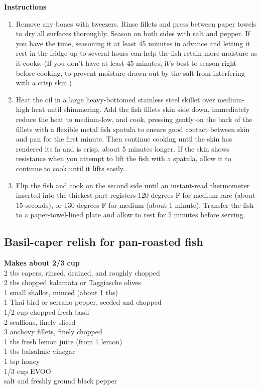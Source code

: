 \documentclass{article}
\numberwithin{figure}{section}
\numberwithin{equation}{section}
\begin{document}
{\bf Instructions}
\begin{enumerate}
\item Remove any bones with tweezers. Rinse fillets and press between paper towels to dry all surfaces thoroughly. Season on both sides with salt and pepper. If you have the time, seasoning it at least 45 minutes in advance and letting it rest in the fridge up to several hours can help the fish retain more moisture as it cooks. (If you don't have at least 45 minutes, it's best to season right before cooking, to prevent moisture drawn out by the salt from interfering with a crisp skin.)

\item Heat the oil in a large heavy-bottomed stainless steel skillet over medium-high heat until shimmering. Add the fish fillets skin side down, immediately reduce the heat to medium-low, and cook, pressing gently on the back of the fillets with a flexible metal fish spatula to ensure good contact between skin and pan for the first minute. Then continue cooking until the skin has rendered its fa and is crisp, about 5 minutes longer. If the skin shows resistance when you attempt to lift the fish with a spatula, allow it to continue to cook until it lifts easily.
\item Flip the fish and cook on the second side until an instant-read thermometer inserted into the thickest part registers 120 degrees F for medium-rare (about 15 seconds), or 130 degrees F for medium (about 1 minute). Transfer the fish to a paper-towel-lined plate and allow to rest for 5 minutes before serving.
\end{enumerate}


\subsection{Basil-caper relish for pan-roasted fish}
{\bf Makes about 2/3 cup}\\
2 tbs capers, rinsed, drained, and roughly chopped\\
2 tbs chopped kalamata or Taggiasche olives\\
1 small shallot, minced (about 1 tbs)\\
1 Thai bird or serrano pepper, seeded and chopped\\
1/2 cup chopped fresh basil\\
2 scallions, finely sliced\\
3 anchovy fillets, finely chopped\\
1 tbs fresh lemon juice (from 1 lemon)\\
1 tbs balsalmic vinegar\\
1 tsp honey\\
1/3 cup EVOO\\
salt and freshly ground black pepper\\
\end{document}
